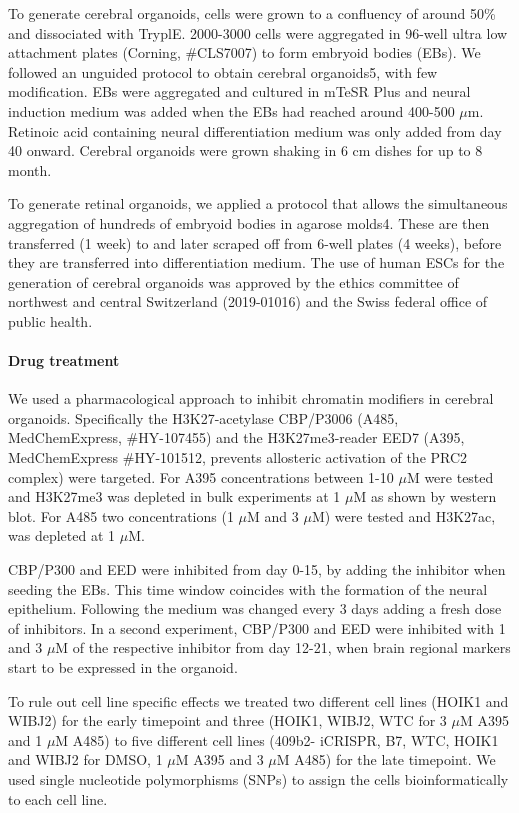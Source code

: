 To generate cerebral organoids, cells were grown to a confluency of around 50\% and dissociated with TryplE. 2000-3000 cells were aggregated in 96-well ultra low attachment plates (Corning, \#CLS7007) to form embryoid bodies (EBs). We followed an unguided protocol to obtain cerebral organoids5, with few modification. EBs were aggregated and cultured in mTeSR Plus and neural induction medium was added when the EBs had reached around 400-500 $\mu$m. Retinoic acid containing neural differentiation medium was only added from day 40 onward. Cerebral organoids were grown shaking in 6 cm dishes for up to 8 month.

To generate retinal organoids, we applied a protocol that allows the simultaneous aggregation of hundreds of embryoid bodies in agarose molds4. These are then transferred (1 week) to and later scraped off from 6-well plates (4 weeks), before they are transferred into differentiation medium.  
The use of human ESCs for the generation of cerebral organoids was approved by the ethics committee of northwest and central Switzerland (2019-01016) and the Swiss federal office of public health.

\paragraph{Drug treatment}
We used a pharmacological approach to inhibit chromatin modifiers in cerebral organoids. Specifically the H3K27-acetylase CBP/P3006 (A485, MedChemExpress, \#HY-107455) and the H3K27me3-reader EED7 (A395, MedChemExpress \#HY-101512, prevents allosteric activation of the PRC2 complex) were targeted. For A395 concentrations between 1-10 $\mu$M were tested and H3K27me3 was depleted in bulk experiments at 1 $\mu$M as shown by western blot. For A485 two concentrations (1 $\mu$M and 3 $\mu$M) were tested and H3K27ac, was depleted at 1 $\mu$M. 

CBP/P300 and EED were inhibited from day 0-15, by adding the inhibitor when seeding the EBs. This time window coincides with the formation of the neural epithelium. Following the medium was changed every 3 days adding a fresh dose of inhibitors. 
In a second experiment, CBP/P300 and EED were inhibited with 1 and 3 $\mu$M of the respective inhibitor from day 12-21, when brain regional markers start to be expressed in the organoid. 

To rule out cell line specific effects we treated two different cell lines (HOIK1 and WIBJ2) for the early timepoint and three (HOIK1, WIBJ2, WTC for 3 $\mu$M A395 and 1 $\mu$M A485) to five different cell lines (409b2- iCRISPR, B7, WTC, HOIK1 and WIBJ2 for DMSO, 1 $\mu$M A395 and 3 $\mu$M A485) for the late timepoint. We used single nucleotide polymorphisms (SNPs) to assign the cells bioinformatically to each cell line.

